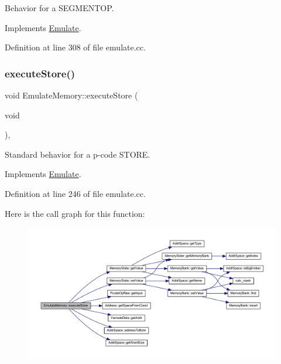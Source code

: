 Behavior for a S\+E\+G\+M\+E\+N\+T\+OP. 



Implements \mbox{\hyperlink{class_emulate_ac4c13159c340cd33ca6f3b69d2b50e38}{Emulate}}.



Definition at line 308 of file emulate.\+cc.

\mbox{\label{class_emulate_memory_a3fed95d66c73d4dad23532f959a9417d}} 
\subsubsection{\texorpdfstring{executeStore()}{executeStore()}}
{\footnotesize\ttfamily void Emulate\+Memory\+::execute\+Store (\begin{DoxyParamCaption}\item[{void}]{ }\end{DoxyParamCaption})\hspace{0.3cm}{\ttfamily [protected]}, {\ttfamily [virtual]}}



Standard behavior for a p-\/code S\+T\+O\+RE. 



Implements \mbox{\hyperlink{class_emulate_a634f0261bf49be73e7d31a2baf9f6e4d}{Emulate}}.



Definition at line 246 of file emulate.\+cc.

Here is the call graph for this function\+:
\nopagebreak
\begin{figure}[H]
\begin{center}
\leavevmode
\includegraphics[width=350pt]{class_emulate_memory_a3fed95d66c73d4dad23532f959a9417d_cgraph}
\end{center}
\end{figure}
\mbox{\label{class_emulate_memory_af31f9f35bb843b59d6a509bcbb045894}} 
